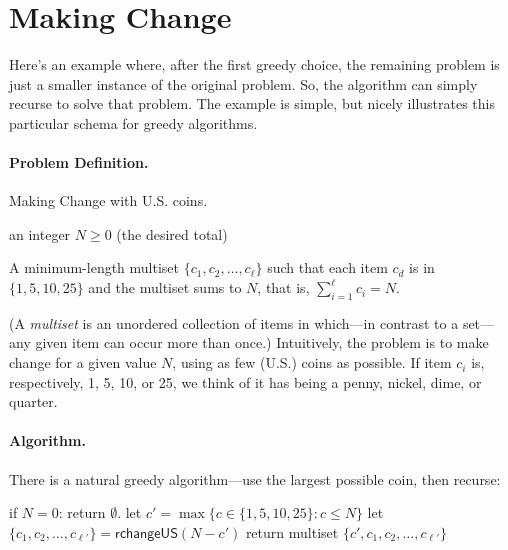 \section{Making Change}\label{greedy: sec: making change}

Here's an example where, after the first greedy choice, the remaining problem
is just a smaller instance of the original problem.
So, the algorithm can simply recurse to solve that problem.
The example is simple, but nicely illustrates this particular schema for greedy algorithms.

\paragraph{Problem Definition.}
Making Change with U.S. coins.
\begin{mylist}
\item[\bf input:] an integer $N\ge 0$ (the desired total)
\item[\bf output:] A minimum-length multiset $\{c_1, c_2, \ldots, c_\ell\}$ such that each item $c_d$ is in $\{1,5,10,25\}$
  and the multiset sums to $N$, that is, $\sum_{i=1}^\ell c_i = N$.
\end{mylist}
(A \emph{multiset} is an unordered collection of items in which---in contrast to a set---any given item can occur more than once.)
Intuitively, the problem is to make change for a given value $N$, using as few (U.S.) coins as possible.
If item $c_i$ is, respectively, 1, 5, 10, or 25,
we think of it has being a penny, nickel, dime, or quarter.

\paragraph{Algorithm.}
There is a natural greedy algorithm---use the largest possible coin, then recurse:

\begin{myframed}
  \begin{steps}
  \item[{\textsf{rchangeUS}$(N)$:}]
    \step if $N = 0$: return $\emptyset$.  
    \step let $c' = \max\big\{c \in \{1, 5, 10, 25\} : c \le N\big\}$
    \step let $\{c_1, c_2, \ldots, c_{\ell'}\} = \textsf{rchangeUS}(N-c')$
    \step return multiset $\{c', c_1, c_2, \ldots, c_{\ell'}\}$ 
  \end{steps}
\end{myframed}

